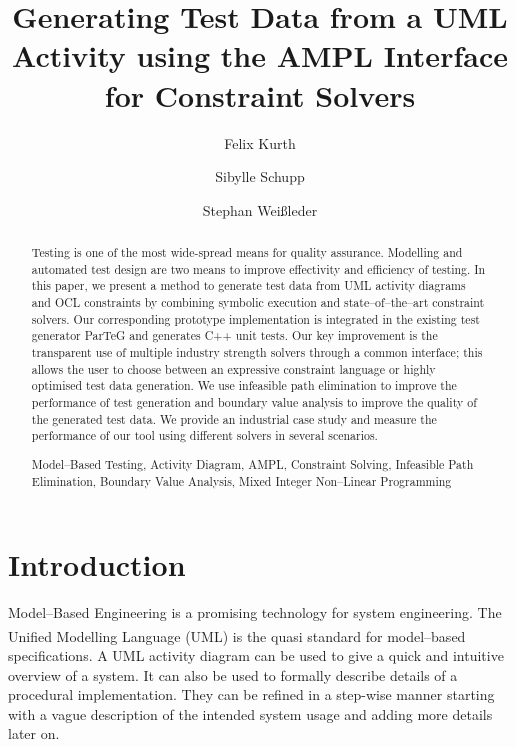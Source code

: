 \documentclass[runningheads,a4paper]{llncs}%
\newcommand{\keywords}[1]{\par\addvspace\baselineskip%
\noindent\keywordname\enspace\ignorespaces#1}%
\begin{document}
%
%
\mainmatter

\title{Generating Test Data from a UML Activity using the AMPL Interface for Constraint Solvers}%

%
\author{Felix Kurth%
\and Sibylle Schupp%
\and Stephan Wei{\ss}leder%
}%

%

\maketitle%
%
\begin{abstract}%
Testing is one of the most wide-spread means for quality assurance. Modelling
and automated test design are two means to improve effectivity and efficiency of
testing. In this paper, we present a method to generate test data from UML
activity diagrams and OCL constraints by combining symbolic execution and
state--of--the--art constraint solvers. Our corresponding prototype
implementation is integrated in the existing test generator ParTeG and generates
C++ unit tests. Our key improvement is the transparent use of multiple industry
strength solvers through a common interface; this allows the user to choose
between an expressive constraint language or highly optimised test data
generation. We use infeasible path elimination to improve the performance of
test generation and boundary value analysis to improve the quality of the
generated test data. We provide an industrial case study and measure the
performance of our tool using different solvers in several scenarios.
\keywords{Model--Based Testing, Activity Diagram, AMPL, Constraint Solving,
Infeasible Path Elimination, Boundary Value Analysis, Mixed Integer Non--Linear
Programming}%
\end{abstract}%
%
\section{Introduction}%
Model--Based Engineering is a promising technology for system engineering.
The Unified Modelling Language\textsuperscript{\texttrademark} (UML) is the
quasi standard for model--based specifications. A UML activity diagram can be
used to give a quick and intuitive overview of a system. It can also be used to
formally describe details of a procedural implementation. They can be refined in
a step-wise manner starting with a vague description of the intended system
usage and adding more details later on.
\end{document}
